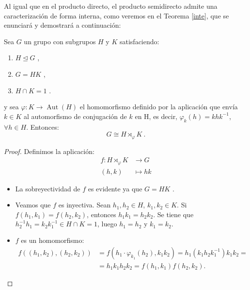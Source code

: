 Al igual que en el producto directo, el producto semidirecto admite una caracterización de forma interna, como veremos en el Teorema \ref{inte}, que se enunciará y demostrará a continuación: 

\begin{theorem} \label{inte}
Sea $G$ un grupo con subgrupos $H$ y $K$ satisfaciendo:
\begin{enumerate}
    \setlength\itemsep{0em}

    \item $H \trianglelefteq G \!$ , \label{item11}
    \item $G=HK$  \!,\label{item22}
    \item $H \cap K = 1$ . \! \label{item33}
\end{enumerate}
y sea $\varphi \colon K \rightarrow \operatorname{Aut}(H)$ el homomorfismo definido por la aplicación que envía $k\in K$ al automorfismo de conjugación de $k$ en H, es decir, $\varphi_k(h)=khk^{-1}$, $\forall h \in H$. Entonces:
\[
   G\cong H \rtimes_{\varphi} K \:.
\]
\end{theorem}


\begin{proof}
\hfill

Definimos la aplicación:
\begin{align*}
    f \colon H \rtimes_{\varphi} K & \rightarrow G \\
    (h,k) &\mapsto hk
\end{align*}
\begin{itemize}
    \setlength\itemsep{0.25em}

    \item La sobreyectividad de $f$ es evidente ya que $G=HK$ \!.
    \item Veamos que $f$ es inyectiva. Sean $h_1, h_2 \in H$, $k_1, k_2 \in K$.  Si $f(h_1, k_1)=f(h_2,k_2)$, entonces $h_1k_1=h_2k_2$. Se tiene que $h_2^{-1}h_1 = k_2k_1^{-1} \in H \cap K = 1$, luego $h_1=h_2$ y $k_1 = k_2$.
    \item $f$ es un homomorfismo:
    \begin{align*}
        f((h_1,k_2),(h_2,k_2))&=f(h_1 \cdot \varphi_{k_1}(h_2), k_1k_2)= h_1(k_1h_2k_1^{-1})k_1k_2= \\
        &=h_1k_1h_2k_2=f(h_1,k_1)f(h_2,k_2) .
    \end{align*}
\end{itemize}
\end{proof}




